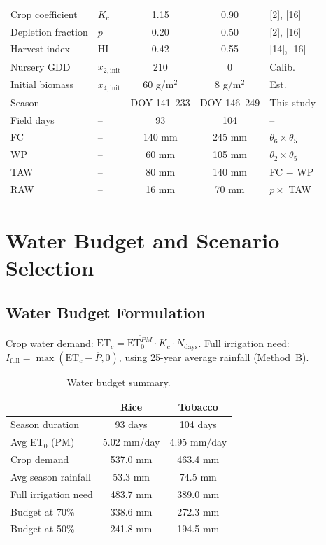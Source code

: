 \documentclass[12pt,a4paper]{article}
\begin{document}
\begin{table}[H]
\begin{tabular}{llccl}
Crop coefficient & $K_c$ & 1.15 & 0.90 & [2], [16] \\
Depletion fraction & $p$ & 0.20 & 0.50 & [2], [16] \\
Harvest index & HI & 0.42 & 0.55 & [14], [16] \\
Nursery GDD & $x_{2,\text{init}}$ & 210 & 0 & Calib. \\
Initial biomass & $x_{4,\text{init}}$ & 60 g/m$^2$ & 8 g/m$^2$ & Est. \\
Season & -- & DOY 141--233 & DOY 146--249 & This study \\
Field days & -- & 93 & 104 & -- \\
FC & -- & 140 mm & 245 mm & $\theta_6 \times \theta_5$ \\
WP & -- & 60 mm & 105 mm & $\theta_2 \times \theta_5$ \\
TAW & -- & 80 mm & 140 mm & FC $-$ WP \\
RAW & -- & 16 mm & 70 mm & $p \times$ TAW \\
\bottomrule
\end{tabular}
\end{table}


\section{Water Budget and Scenario Selection}

\subsection{Water Budget Formulation}

Crop water demand: $\text{ET}_c = \overline{\text{ET}_0^{PM}} \cdot K_c \cdot N_{\text{days}}$. Full irrigation need: $I_{\text{full}} = \max(\text{ET}_c - \overline{P}, 0)$, using 25-year average rainfall (Method~B).

\begin{table}[H]
\centering
\caption{Water budget summary.}
\label{tab:budget}
\begin{tabular}{lcc}
\toprule
& \textbf{Rice} & \textbf{Tobacco} \\
\midrule
Season duration & 93 days & 104 days \\
Avg ET$_0$ (PM) & 5.02 mm/day & 4.95 mm/day \\
Crop demand & 537.0 mm & 463.4 mm \\
Avg season rainfall & 53.3 mm & 74.5 mm \\
Full irrigation need & 483.7 mm & 389.0 mm \\
Budget at 70\% & 338.6 mm & 272.3 mm \\
Budget at 50\% & 241.8 mm & 194.5 mm \\
\bottomrule
\end{tabular}
\end{table}
\end{document}
